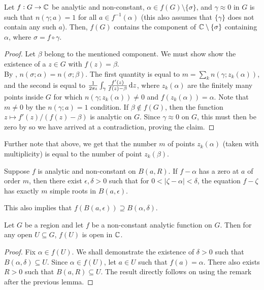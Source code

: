 		\begin{prop}
			Let $f : G \to \mathbb{C}$ be analytic and non-constant, $\alpha \in f(G) \setminus \{\sigma\}$, and $\gamma \approx 0$ in $G$ is such that $n(\gamma;a) = 1$ for all $a \in f^{-1}(\alpha)$ (this also assumes that $\{\gamma\}$ does not contain any such $a$). Then, $f(G)$ contains the component of $\mathbb{C}\setminus\{\sigma\}$ containing $\alpha$, where $\sigma = f \circ \gamma$.
		\end{prop}
		\begin{proof}
			Let $\beta$ belong to the mentioned component. We must show show the existence of a $z \in G$ with $f(z) = \beta$.\\
			By , $n(\sigma;\alpha) = n(\sigma;\beta)$. The first quantity is equal to $m = \sum_k n(\gamma;z_k(\alpha))$, and the second is equal to $\frac{1}{2\pi\iota} \int_\gamma \frac{f'(z)}{f(z)-\beta} \dif z$, where $z_k(\alpha)$ are the finitely many points inside $G$ for which $n(\gamma;z_k(\alpha)) \ne 0$ and $f(z_k(\alpha)) = \alpha$. Note that $m \ne 0$ by the $n(\gamma;a) = 1$ condition. If $\beta \not\in f(G)$, then the function $z \mapsto f'(z) / (f(z) - \beta)$ is analytic on $G$. Since $\gamma \approx 0$ on $G$, this must then be zero by  so we have arrived at a contradiction, proving the claim.
		\end{proof}

		Further note that above, we get that the number $m$ of points $z_k(\alpha)$ (taken with multiplicity) is equal to the number of point $z_k(\beta)$.

		\begin{lemma}
			\label{lemma: open mapping lemma}
			Suppose $f$ is analytic and non-constant on $B(a,R)$. If $f-\alpha$ has a zero at $a$ of order $m$, then there exist $\epsilon,\delta > 0$ such that for $0 < |\zeta-\alpha| < \delta$, the equation $f-\zeta$ has exactly $m$ simple roots in $B(a,\epsilon)$.
		\end{lemma}

		This also implies that $f(B(a,\epsilon)) \supseteq B(\alpha,\delta)$.

		\begin{ftheo}
			\label{open mapping theorem}
			Let $G$ be a region and let $f$ be a non-constant analytic function on $G$. Then for any open $U \subseteq G$, $f(U)$ is open in $\mathbb{C}$.
		\end{ftheo}
		\begin{proof}
			Fix $\alpha \in f(U)$. We shall demonstrate the existence of $\delta > 0$ such that $B(\alpha,\delta) \subseteq U$. Since $\alpha \in f(U)$, let $a \in U$ such that $f(a) = \alpha$. There also exists $R > 0$ such that $B(a,R) \subseteq U$. The result directly follows on using the remark after the previous lemma.
		\end{proof}

